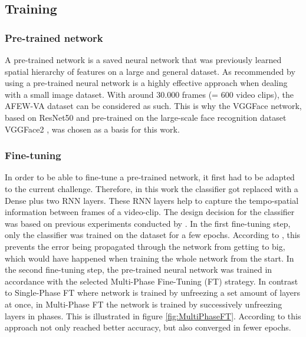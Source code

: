 \subsection{Training} \label{sec:Training&Regularization}
\subsubsection{Pre-trained network}
A pre-trained network is a saved neural network that was previously learned spatial hierarchy of features on a large and general dataset. As recommended by \citet{Chollet:2017:DeepLearningPython} using a pre-trained neural network is a highly effective approach when dealing with a small image dataset. With around 30.000 frames (= 600 video clips), the AFEW-VA dataset \citep{Kossaifi:2017:AFEW-VADatabase} can be considered as such. This is why the VGGFace network, based on ResNet50 and pre-trained on the large-scale face recognition dataset VGGFace2 \citep{Cao:2018:VGGFace2}, was chosen as a basis for this work.

\subsubsection{Fine-tuning}
In order to be able to fine-tune a pre-trained network, it first had to be adapted to the current challenge. Therefore, in this work the classifier got replaced with a Dense plus two RNN layers. These RNN layers help to capture the tempo-spatial information between frames of a video-clip. The design decision for the classifier was based on previous experiments conducted by \citet{Kollias:2019:AffWild}.
\newline\newline
In the first fine-tuning step, only the classifier was trained on the dataset for a few epochs. According to \citet{Chollet:2017:DeepLearningPython}, this prevents the error being propagated through the network from getting to big, which would have happened when training the whole network from the start. 
\newline\newline
In the second fine-tuning step, the pre-trained neural network was trained in accordance with the selected Multi-Phase Fine-Tuning (FT) \citep{Sarhan:2020:MultiPhaseFineTuning} strategy. In contrast to Single-Phase FT where network is trained by unfreezing a set amount of layers at once, in Multi-Phase FT the network is trained by successively unfreezing layers in phases. This is illustrated in figure \ref{fig:MultiPhaseFT}. According to \citet{Sarhan:2020:MultiPhaseFineTuning} this approach not only reached better accuracy, but also converged in fewer epochs. 

